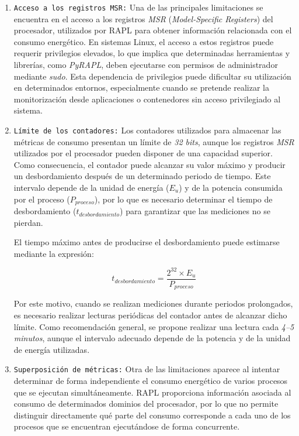   \begin{enumerate}
  
     \item \texttt{Acceso a los registros MSR:} Una de las principales limitaciones se encuentra en el acceso a los registros \textit{MSR} (\textit{Model-Specific Registers}) del procesador, utilizados por RAPL para obtener información relacionada con el consumo energético. En sistemas Linux, el acceso a estos registros puede requerir privilegios elevados, lo que implica que determinadas herramientas y librerías, como \textit{PyRAPL}, deben ejecutarse con permisos de administrador mediante \textit{sudo}. Esta dependencia de privilegios puede dificultar su utilización en determinados entornos, especialmente cuando se pretende realizar la monitorización desde aplicaciones o contenedores sin acceso privilegiado al sistema.
  
     \item \texttt{Límite de los contadores:} Los contadores utilizados para almacenar las métricas de consumo presentan un límite de \textit{32 bits}, aunque los registros \textit{MSR} utilizados por el procesador pueden disponer de una capacidad superior. Como consecuencia, el contador puede alcanzar su valor máximo y producir un desbordamiento después de un determinado periodo de tiempo. Este intervalo depende de la unidad de energía ($E_{u}$) y de la potencia consumida por el proceso ($P_{proceso}$), por lo que es necesario determinar el tiempo de desbordamiento ($t_{desbordamiento}$) para garantizar que las mediciones no se pierdan.
  
     El tiempo máximo antes de producirse el desbordamiento puede estimarse mediante la expresión:
  
     \[
     t_{desbordamiento} = \frac{2^{32} \times E_u}{P_{proceso}}
     \label{eq:tiempo-desbordamiento}
     \]
  
     Por este motivo, cuando se realizan mediciones durante periodos prolongados, es necesario realizar lecturas periódicas del contador antes de alcanzar dicho límite. Como recomendación general, se propone realizar una lectura cada \textit{4--5 minutos}, aunque el intervalo adecuado depende de la potencia y de la unidad de energía utilizadas.
  
     \item \texttt{Superposición de métricas:} Otra de las limitaciones aparece al intentar determinar de forma independiente el consumo energético de varios procesos que se ejecutan simultáneamente. RAPL proporciona información asociada al consumo de determinados dominios del procesador, por lo que no permite distinguir directamente qué parte del consumo corresponde a cada uno de los procesos que se encuentran ejecutándose de forma concurrente.
  

\end{enumerate}
